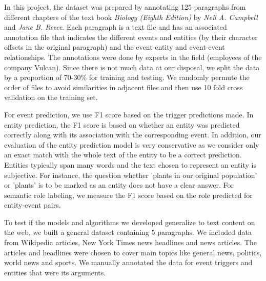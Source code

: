 In this project, the dataset was prepared by annotating 125 paragraphs from different chapters of the text book {\em Biology (Eighth Edition)} by {\em Neil A. Campbell} and {\em Jane B. Reece}. Each paragraph is a text file and has an associated annotation file that indicates the different events and entities (by their character offsets in the original paragraph) and the event-entity and event-event relationships. The annotations were done by experts in the field (employees of the company Vulcan). Since there is not much data at our disposal, we split the data by a proportion of 70-30\% for training and testing. We randomly permute the order of files to avoid similarities in adjacent files and then use 10 fold cross validation on the training set. 

For event prediction, we use F1 score based on the trigger predictions made. In entity prediction, the F1 score is based on whether an entity was predicted correctly along with its association with the corresponding event. In addition, our evaluation of the entity prediction model is very conservative as we consider only an exact match with the whole text of the entity to be a correct prediction. Entities typically span many words and the text chosen to represent an entity is subjective. For instance, the question whether 'plants in our original population' or 'plants' is to be marked as an entity does not have a clear answer. For semantic role labeling, we measure the F1 score based on the role predicted for entity-event pairs.

To test if the models and algorithms we developed generalize to text content on the web, we built a general dataset containing 5 paragraphs. We included data from Wikipedia articles, New York Times news headlines and news articles. The articles and headlines were chosen to cover main topics like general news, politics, world news and sports. We manually annotated the data for event triggers and entities that were its arguments.